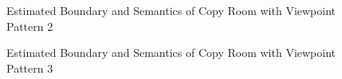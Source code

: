 \documentclass[11pt, a4paper,oneside,chapterprefix=false]{scrbook}
\begin{document}
\begin{figure}[H]
    \centering
      \label{fig:copy b 200 4} \hfill
     \label{fig:copy s 200 4}
    \caption{Estimated Boundary and Semantics of Copy Room with Viewpoint Pattern 2}
    \label{fig:copy 4}
\end{figure}

\vspace{30pt}

\begin{figure}[H]
    \centering
      \label{fig:copy b 200 5} \hfill
     \label{fig:copy s 200 5}
    \caption{Estimated Boundary and Semantics of Copy Room with Viewpoint Pattern 3}
    \label{fig:copy 5}
\end{figure}
\end{document}
